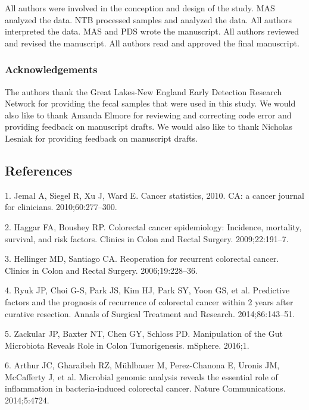 \documentclass[12pt,]{article}
\begin{document}
All authors were involved in the conception and design of the study. MAS
analyzed the data. NTB processed samples and analyzed the data. All
authors interpreted the data. MAS and PDS wrote the manuscript. All
authors reviewed and revised the manuscript. All authors read and
approved the final manuscript.

\subsubsection{Acknowledgements}\label{acknowledgements}

The authors thank the Great Lakes-New England Early Detection Research
Network for providing the fecal samples that were used in this study. We
would also like to thank Amanda Elmore for reviewing and correcting code
error and providing feedback on manuscript drafts. We would also like to
thank Nicholas Lesniak for providing feedback on manuscript drafts.

\newpage

\subsection*{References}\label{references}

\hypertarget{refs}{}
\hypertarget{ref-jemal_cancer_2010}{}
1. Jemal A, Siegel R, Xu J, Ward E. Cancer statistics, 2010. CA: a
cancer journal for clinicians. 2010;60:277--300.

\hypertarget{ref-haggar_colorectal_2009}{}
2. Haggar FA, Boushey RP. Colorectal cancer epidemiology: Incidence,
mortality, survival, and risk factors. Clinics in Colon and Rectal
Surgery. 2009;22:191--7.

\hypertarget{ref-hellinger_reoperation_2006}{}
3. Hellinger MD, Santiago CA. Reoperation for recurrent colorectal
cancer. Clinics in Colon and Rectal Surgery. 2006;19:228--36.

\hypertarget{ref-ryuk_predictive_2014}{}
4. Ryuk JP, Choi G-S, Park JS, Kim HJ, Park SY, Yoon GS, et al.
Predictive factors and the prognosis of recurrence of colorectal cancer
within 2 years after curative resection. Annals of Surgical Treatment
and Research. 2014;86:143--51.

\hypertarget{ref-zackular_manipulation_2016}{}
5. Zackular JP, Baxter NT, Chen GY, Schloss PD. Manipulation of the Gut
Microbiota Reveals Role in Colon Tumorigenesis. mSphere. 2016;1.

\hypertarget{ref-arthur_microbial_2014}{}
6. Arthur JC, Gharaibeh RZ, Mühlbauer M, Perez-Chanona E, Uronis JM,
McCafferty J, et al. Microbial genomic analysis reveals the essential
role of inflammation in bacteria-induced colorectal cancer. Nature
Communications. 2014;5:4724.
\end{document}
